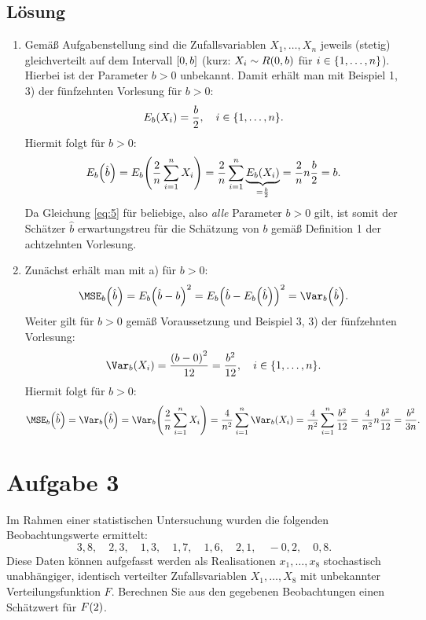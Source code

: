 \documentclass{exercise}
\begin{document}
    \subsection*{Lösung}
    \begin{enumerate}
        \item Gemäß Aufgabenstellung sind die Zufallsvariablen \(X_1, \ldots, X_n\) jeweils (stetig) gleichverteilt auf dem Intervall \(\brackets*{0, b}\) (kurz: \(X_i \sim R\parentheses*{0, b}\) für \(i \in \braces*{1, \ldots, n}\)).
        Hierbei ist der Parameter \(b > 0\) unbekannt.
        Damit erhält man mit Beispiel 1, 3) der fünfzehnten Vorlesung für \(b > 0\):
        \[
            E_b\parentheses*{X_i} = \frac{b}{2}, \quad i \in \braces*{1, \ldots, n}.
        \]
        Hiermit folgt für \(b > 0\):
        \begin{equation}\label{eq:5}
            E_b\parentheses*{\hat{b}} = E_b\parentheses*{\frac{2}{n}\sum_{i = 1}^n X_i} = \frac{2}{n}\sum_{i = 1}^n \underbrace{E_b\parentheses*{X_i}}_{= \frac{b}{2}} = \frac{2}{n}n\frac{b}{2} = b.
        \end{equation}
        Da Gleichung \eqref{eq:5} für beliebige, also \emph{alle} Parameter \(b > 0\) gilt, ist somit der Schätzer \(\hat{b}\) erwartungstreu für die Schätzung von \(b\) gemäß Definition 1 der achtzehnten Vorlesung.
        \item Zunächst erhält man mit a) für \(b > 0\):
        \[
            \MSE_b\parentheses*{\hat{b}} = E_b\parentheses*{\hat{b} - b}^2 = E_b\parentheses*{\hat{b} - E_b\parentheses*{\hat{b}}}^2 = \Var_b\parentheses*{\hat{b}}.
        \]
        Weiter gilt für \(b > 0\) gemäß Voraussetzung und Beispiel 3, 3) der fünfzehnten Vorlesung:
        \[
            \Var_b\parentheses*{X_i} = \frac{\parentheses*{b - 0}^2}{12} = \frac{b^2}{12}, \quad i \in \braces*{1, \ldots, n}.
        \]
        Hiermit folgt für \(b > 0\):
        \[
            \MSE_b\parentheses*{\hat{b}} = \Var_b\parentheses*{\hat{b}} = \Var_b\parentheses*{\frac{2}{n}\sum_{i = 1}^n X_i} = \frac{4}{n^2}\sum_{i = 1}^n \Var_b\parentheses*{X_i} = \frac{4}{n^2}\sum_{i = 1}^n \frac{b^2}{12} = \frac{4}{n^2}n\frac{b^2}{12} = \frac{b^2}{3n}.
        \]
    \end{enumerate}
    
    
    \section*{Aufgabe 3}
    
    \begin{problem}
        Im Rahmen einer statistischen Untersuchung wurden die folgenden Beobachtungswerte ermittelt:
        \[
            3,8, \quad 2,3, \quad 1,3, \quad 1,7, \quad 1,6, \quad 2,1, \quad -0,2, \quad 0,8.
        \]
        Diese Daten können aufgefasst werden als Realisationen \(x_1, \ldots, x_8\) stochastisch unabhängiger, identisch verteilter Zufallsvariablen \(X_1, \ldots, X_8\) mit unbekannter Verteilungsfunktion \(F\).
        Berechnen Sie aus den gegebenen Beobachtungen einen Schätzwert für \(F\parentheses*{2}\).
    \end{problem}
    
\end{document}
